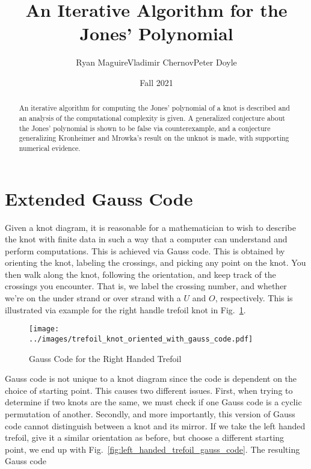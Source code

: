 \documentclass{article}
\title{An Iterative Algorithm for the Jones' Polynomial}
\author{Ryan Maguire\hspace{2em}Vladimir Chernov\hspace{2em}Peter Doyle}
\date{Fall 2021}
\theoremstyle{plain}
\begin{document}
    \maketitle
    \tableofcontents
    \begin{abstract}
        \noindent
        An iterative algorithm for computing the Jones' polynomial of a knot
        is described and an analysis of the computational complexity is given.
        A generalized conjecture about the Jones' polynomial is shown to be
        false via counterexample, and a conjecture generalizing Kronheimer and
        Mrowka's result on the unknot is made, with supporting numerical
        evidence.
    \end{abstract}
    \section{Extended Gauss Code}
        Given a knot diagram, it is reasonable for a mathematician to wish to
        describe the knot with finite data in such a way that a computer can
        understand and perform computations. This is achieved via Gauss code.
        This is obtained by orienting the knot, labeling the crossings, and
        picking any point on the knot. You then walk along the knot, following
        the orientation, and keep track of the crossings you encounter. That is,
        we label the crossing number, and whether we're on the under strand or
        over strand with a $U$ and $O$, respectively. This is
        illustrated via example for the right handle trefoil knot in
        Fig.~\ref{fig:right_handed_trefoil_gauss_code}.
        \begin{figure}
            \centering
            \texttt{[image: ../images/trefoil\_knot\_oriented\_with\_gauss\_code.pdf]}
            \caption{Gauss Code for the Right Handed Trefoil}
            \label{fig:right_handed_trefoil_gauss_code}
        \end{figure}
        Gauss code is not unique to a knot diagram since the code is dependent
        on the choice of starting point. This causes two different issues.
        First, when trying to determine if two knots are the same, we must
        check if one Gauss code is a cyclic permutation of another. Secondly,
        and more importantly, this version of Gauss code cannot distinguish
        between a knot and its mirror. If we take the left handed trefoil,
        give it a similar orientation as before, but choose a different
        starting point, we end up with
        Fig.~\ref{fig:left_handed_trefoil_gauss_code}. The resulting Gauss code
\end{document}
